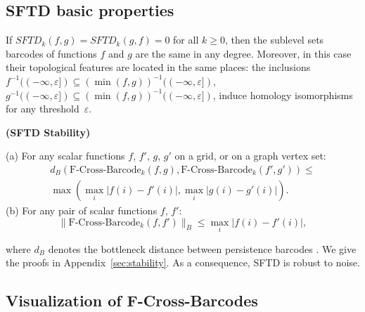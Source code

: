\documentclass[runningheads]{llncs}
\begin{document}
\subsection{SFTD basic properties}
\begin{proposition} 
\label{prop_std}
If $SFT\!D_k(f, g) = SFT\!D_k(g, f)=0$ for all $k \geq 0$, then the sublevel sets barcodes of functions  $f$ and $g$ are the same in any degree. Moreover, in this case their topological features are located in the same places: 
the inclusions $ f^{-1}((-\infty, \varepsilon])\subseteq  (\min(f,g))^{-1}((-\infty, \varepsilon])$,  $ g^{-1}((-\infty, \varepsilon])\subseteq  (\min(f,g))^{-1}((-\infty, \varepsilon])$, induce homology isomorphisms for any threshold~$\varepsilon$.
\end{proposition}

\begin{proposition}\label{prop:stab}\textbf{(SFTD Stability)}

  (a) For any scalar functions $f$, $f'$, $g$, 
 $g'$ on a grid, or on a graph vertex set: 
  \vskip-0.25in
\begin{multline}
    d_B(\text{F-Cross-Barcode} _ k(f,g), \text{F-Cross-Barcode} _ k(f',g')) \leq \\ \max(\max _ {i} \lvert f(i)-f'(i)\rvert ,\max _ {i} \lvert g(i)-g'(i)\rvert ). \nonumber
\end{multline}
 \vskip-0.15in
(b) For any  pair of scalar functions $f$, $f'$: 
 \vskip-0.1in
 $$\lVert \text{F-Cross-Barcode}_k(f,f')\rVert_B \leq \max_{i} \lvert f(i)-f'(i)\rvert,$$ 
\vskip-0.1in
\end{proposition}

where $d_B$ denotes the bottleneck distance between persistence barcodes \cite{chazal2017introduction}.
We give the proofs in Appendix~\ref{sec:stability}.
As a consequence, SFTD is robust to noise.

\subsection{Visualization of F-Cross-Barcodes}
\end{document}

